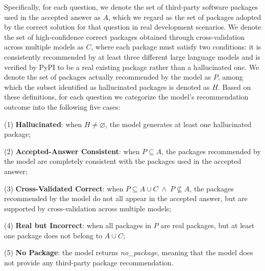 Specifically, for each question, we denote the set of third-party software packages used in the accepted answer as $A$, which we regard as the set of packages adopted 
by the correct solution for that question in real development scenarios. We denote the set of high-confidence correct packages obtained through cross-validation across 
multiple models as $C$, where each package must satisfy two conditions: it is consistently recommended by at least three different large language models and is 
verified by PyPI to be a real existing package rather than a hallucinated one. We denote the set of packages actually recommended by the model as $P$, among which 
the subset identified as hallucinated packages is denoted as $H$. Based on these definitions, for each question we categorize the model’s recommendation outcome into 
the following five cases:

(1) \textbf{Hallucinated}: when $H \neq \varnothing$, the model generates at least one hallucinated package;

(2) \textbf{Accepted-Answer Consistent}: when $P \subseteq A$, the packages recommended by the model are completely consistent with the packages used in the accepted answer;

(3) \textbf{Cross-Validated Correct}: when $P \subseteq A \cup C \;\wedge\; P \nsubseteq A$, the packages recommended by the model do not all appear in the accepted answer, but are supported by cross-validation across multiple models;

(4) \textbf{Real but Incorrect}: when all packages in $P$ are real packages, but at least one package does not belong to $A \cup C$;

(5) \textbf{No Package}: the model returns \textit{no\_package}, meaning that the model does not provide any third-party package recommendation.

